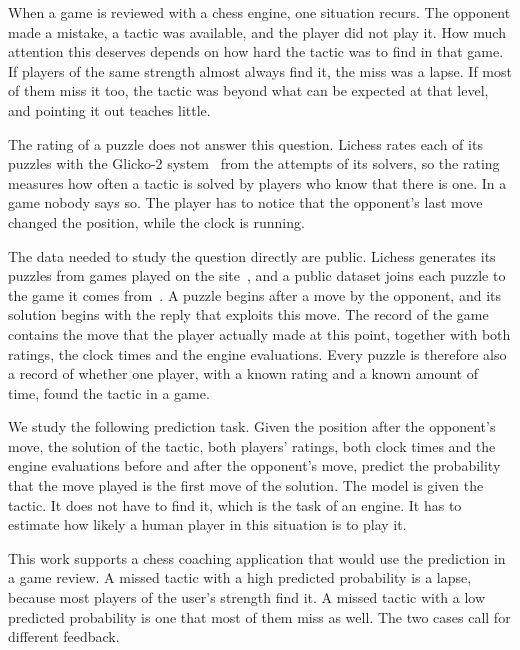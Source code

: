 \documentclass[11pt]{article}
\begin{document}
When a game is reviewed with a chess engine, one situation recurs. The
opponent made a mistake, a tactic was available, and the player did not play
it. How much attention this deserves depends on how hard the tactic was to
find in that game. If players of the same strength almost always find it,
the miss was a lapse. If most of them miss it too, the tactic was beyond
what can be expected at that level, and pointing it out teaches little.

The rating of a puzzle does not answer this question. Lichess rates each of
its puzzles with the Glicko-2 system~\cite{glicko2} from the attempts of its
solvers, so the rating measures how often a tactic is solved by players who
know that there is one. In a game nobody says so. The player has to notice
that the opponent's last move changed the position, while the clock is
running.

The data needed to study the question directly are public. Lichess generates
its puzzles from games played on the site~\cite{lichessdb}, and a public
dataset joins each puzzle to the game it comes from~\cite{puzzlegames}. A
puzzle begins after a move by the opponent, and its solution begins with the
reply that exploits this move. The record of the game contains the move that
the player actually made at this point, together with both ratings, the clock
times and the engine evaluations. Every puzzle is therefore also a record of
whether one player, with a known rating and a known amount of time, found the
tactic in a game.

We study the following prediction task. Given the position after the
opponent's move, the solution of the tactic, both players' ratings, both
clock times and the engine evaluations before and after the opponent's move,
predict the probability that the move played is the first move of the
solution. The model is given the tactic. It does not have to find it, which
is the task of an engine. It has to estimate how likely a human player in
this situation is to play it.

This work supports a chess coaching application that would use the
prediction in a game review. A missed tactic with a high predicted
probability is a lapse, because most players of the user's strength find it.
A missed tactic with a low predicted probability is one that most of them
miss as well. The two cases call for different feedback.
\end{document}
